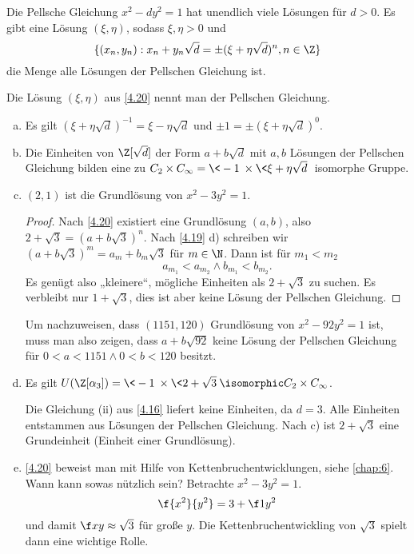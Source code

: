 \begin{st} \label{4.20}
	Die Pellsche Gleichung $x^2 - dy^2 = 1$ hat unendlich viele Lösungen für $d > 0$.
	Es gibt eine Lösung $(\xi, \eta)$, sodass $\xi, \eta > 0$ und
	\[
		\{(x_n, y_n) : x_n + y_n \sqrt d = \pm (\xi + \eta \sqrt d)^n, n \in \Z \}
	\]
	die Menge alle Lösungen der Pellschen Gleichung ist.
\end{st}

\begin{df} \label{4.21}
	Die Lösung $(\xi, \eta)$ aus \ref{4.20} nennt man  der Pellschen Gleichung.
\end{df}

\begin{nt} \label{4.22}
	\begin{enumerate}[a)]
		\item
			Es gilt $(\xi + \eta \sqrt d)^{-1} = \xi - \eta \sqrt d$ und $\pm 1 = \pm (\xi + \eta \sqrt d)^0$.
		\item
			Die Einheiten von $\Z[\sqrt d]$ der Form $a + b \sqrt d$ mit $a, b$ Lösungen der Pellschen Gleichung bilden eine zu $C_2 \times C_\infty = \<-1\> \times \<\xi + \eta \sqrt d\>$ isomorphe Gruppe.
		\item
			$(2,1)$ ist die Grundlösung von $x^2 - 3y^2 = 1$.
			\begin{proof}
				Nach \ref{4.20} existiert eine Grundlösung $(a,b)$, also $2 + \sqrt 3 = (a + b\sqrt 3)^n$.
				Nach \ref{4.19} d) schreiben wir $(a + b \sqrt 3)^m = a_m + b_m \sqrt 3$ für $m \in \N$.
				Dann ist für $m_1 < m_2$
				\[
					a_{m_1} < a_{m_2} \land b_{m_1} < b_{m_2}.
				\]
				Es genügt also „kleinere“, mögliche Einheiten als $2 + \sqrt 3$ zu suchen.
				Es verbleibt nur $1 + \sqrt 3$, dies ist aber keine Lösung der Pellschen Gleichung.
			\end{proof}
			Um nachzuweisen, dass $(1151, 120)$ Grundlösung von $x^2 - 92y^2 = 1$ ist, muss man also zeigen, dass $a + b\sqrt{92}$ keine Lösung der Pellschen Gleichung für $0 < a < 1151 \land 0 < b < 120$ besitzt.
		\item
			Es gilt $U(\Z[\alpha_3]) = \<-1\> \times \<2 + \sqrt 3\> \isomorphic C_2 \times C_\infty$.

			Die Gleichung (ii) aus \ref{4.16} liefert keine Einheiten, da $d = 3$.
			Alle Einheiten entstammen aus Lösungen der Pellschen Gleichung.
			Nach c) ist $2 + \sqrt 3$ eine Grundeinheit (Einheit einer Grundlösung).
		\item
			\ref{4.20} beweist man mit Hilfe von Kettenbruchentwicklungen, siehe \ref{chap:6}.
			Wann kann sowas nützlich sein?
			Betrachte $x^2 - 3y^2 = 1$.
			\[
				\f{x^2}{y^2} = 3 + \f 1{y^2}
			\]
			und damit $\f xy \approx \sqrt 3$ für große $y$.
			Die Kettenbruchentwickling von $\sqrt 3$ spielt dann eine wichtige Rolle.
	\end{enumerate}
\end{nt}


